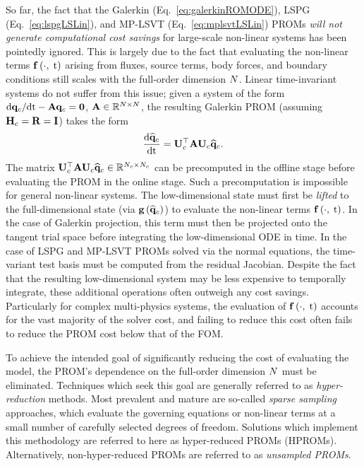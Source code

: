 So far, the fact that the Galerkin (Eq.~\ref{eq:galerkinROMODE}), LSPG (Eq.~\ref{eq:lspgLSLin}), and MP-LSVT (Eq.~\ref{eq:mplsvtLSLin}) PROMs \textit{will not generate computational cost savings} for large-scale non-linear systems has been pointedly ignored. This is largely due to the fact that evaluating the non-linear terms $\mathbf{f} \left(\cdot, \; \text{t}\right)$ arising from fluxes, source terms, body forces, and boundary conditions still scales with the full-order dimension $N$. Linear time-invariant systems do not suffer from this issue; given a system of the form $\text{d}\mathbf{q}_{c}/\text{d}\text{t} - \mathbf{A} \mathbf{q}_{c} = \mathbf{0}$, $\mathbf{A} \in \mathbb{R}^{N \times N}$, the resulting Galerkin PROM (assuming $\consScale = \resScale = \identMat$) takes the form
%
\begin{equation}
    \ode{\consVecCoef}{\timeVar} = \consTrial^\top \dummyMat \consTrial \consVecCoef.
\end{equation}
%
The matrix $\consTrial^\top \dummyMat \consTrial \consVecCoef \inRTwo{\numConsModes}{\numConsModes}$ can be precomputed in the offline stage before evaluating the PROM in the online stage. Such a precomputation is impossible for general non-linear systems. The low-dimensional state must first be \textit{lifted} to the full-dimensional state (via $\mathbf{g} \left(\mathbf{\widehat{q}}_{c}\right)$) to evaluate the non-linear terms $\mathbf{f} \left(\cdot, \; \text{t}\right)$. In the case of Galerkin projection, this term must then be projected onto the tangent trial space before integrating the low-dimensional ODE in time. In the case of LSPG and MP-LSVT PROMs solved via the normal equations, the time-variant test basis must be computed from the residual Jacobian. Despite the fact that the resulting low-dimensional system may be less expensive to temporally integrate, these additional operations often outweigh any cost savings. Particularly for complex multi-physics systems, the evaluation of $\mathbf{f} \left(\cdot, \; \text{t}\right)$ accounts for the vast majority of the solver cost, and failing to reduce this cost often fails to reduce the PROM cost below that of the FOM.

To achieve the intended goal of significantly reducing the cost of evaluating the model, the PROM's dependence on the full-order dimension $N$ must be eliminated. Techniques which seek this goal are generally referred to as \textit{hyper-reduction} methods. Most prevalent and mature are so-called \textit{sparse sampling} approaches, which evaluate the governing equations or non-linear terms at a small number of carefully selected degrees of freedom. Solutions which implement this methodology are referred to here as hyper-reduced PROMs (HPROMs). Alternatively, non-hyper-reduced PROMs are referred to as \textit{unsampled PROMs}.

